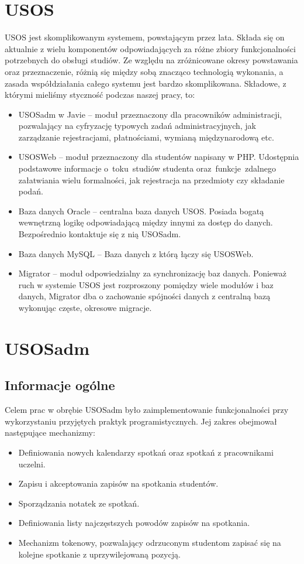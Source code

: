 \documentclass[licencjacka]{pracamgr}
\begin{document}
\section{USOS}
USOS jest skomplikowanym systemem, powstającym przez lata. Składa się on aktualnie z wielu komponentów odpowiadających za różne zbiory funkcjonalności potrzebnych do obsługi studiów. Ze względu na zróżnicowane okresy powstawania oraz przeznaczenie, różnią się między sobą znacząco technologią wykonania, a zasada współdziałania całego systemu jest bardzo skomplikowana.
Składowe, z którymi mieliśmy styczność podczas naszej pracy, to:
\begin{itemize}
\item USOSadm w Javie -- moduł przeznaczony dla pracowników administracji, pozwalający na cyfryzację typowych zadań administracyjnych, jak zarządzanie rejestracjami, płatnościami, wymianą międzynarodową etc.
\item USOSWeb -- moduł przeznaczony dla studentów napisany w PHP. Udostępnia podstawowe informacje o~toku~studiów studenta oraz~funkcje~zdalnego załatwiania wielu formalności, jak rejestracja na przedmioty czy składanie podań.
\item Baza danych Oracle -- centralna baza danych USOS. Posiada bogatą wewnętrzną logikę odpowiadającą między innymi za dostęp do danych. Bezpośrednio kontaktuje się z nią USOSadm.
\item Baza danych MySQL -- Baza danych z którą łączy się USOSWeb.
\item Migrator -- moduł odpowiedzialny za synchronizację baz danych. Ponieważ ruch w systemie USOS jest rozproszony pomiędzy wiele modułów i baz danych, Migrator dba o zachowanie spójności danych z centralną bazą wykonując częste, okresowe migracje.
\end{itemize}

\section{USOSadm} \label{sec:impusos}

\subsection{Informacje ogólne}
Celem prac w obrębie USOSadm było zaimplementowanie funkcjonalności przy wykorzystaniu przyjętych praktyk programistycznych. Jej zakres obejmował następujące mechanizmy:
\begin{itemize}
\item Definiowania nowych kalendarzy spotkań oraz spotkań z pracownikami uczelni.
\item Zapisu i akceptowania zapisów na spotkania studentów.
\item Sporządzania notatek ze spotkań.
\item Definiowania listy najczęstszych powodów zapisów na spotkania.
\item Mechanizm tokenowy, pozwalający odrzuconym studentom zapisać się na kolejne spotkanie z uprzywilejowaną pozycją.
\end{itemize}
\end{document}
